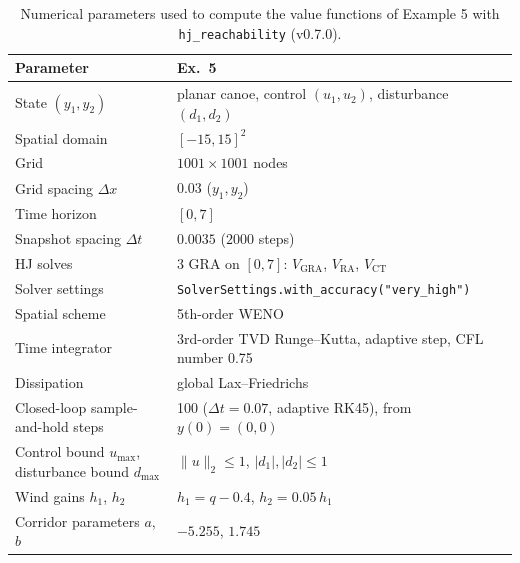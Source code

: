 \begin{table}[h]
\centering
\caption{Numerical parameters used to compute the value functions of Example 5 with \texttt{hj\_reachability} (v0.7.0).}
\label{tab:ex5_numerics}
\begin{tabular}{ll}
\toprule
Parameter & Ex.~5 \\
\midrule
State $(y_1, y_2)$ & planar canoe, control $(u_1, u_2)$, disturbance $(d_1, d_2)$ \\
Spatial domain & $[-15, 15]^2$ \\
Grid & $1001 \times 1001$ nodes \\
Grid spacing $\Delta x$ & $0.03$ ($y_1, y_2$) \\
Time horizon & $[0, 7]$ \\
Snapshot spacing $\Delta t$ & $0.0035$ ($2000$ steps) \\
HJ solves & $3$ GRA on $[0, 7]$: $V_{\mathrm{GRA}}$, $V_{\mathrm{RA}}$, $V_{\mathrm{CT}}$ \\
Solver settings & \texttt{SolverSettings.with\_accuracy("very\_high")} \\
Spatial scheme & 5th-order WENO \\
Time integrator & 3rd-order TVD Runge--Kutta, adaptive step, CFL number 0.75 \\
Dissipation & global Lax--Friedrichs \\
Closed-loop sample-and-hold steps & 100 ($\Delta t = 0.07$, adaptive RK45), from $y(0) = (0, 0)$ \\
\midrule
Control bound $u_{\max}$, disturbance bound $d_{\max}$ & $\|u\|_2 \le 1$, $|d_1|, |d_2| \le 1$ \\
Wind gains $h_1$, $h_2$ & $h_1 = q - 0.4$, $h_2 = 0.05\, h_1$ \\
Corridor parameters $a$, $b$ & $-5.255$, $1.745$ \\
\bottomrule
\end{tabular}
\end{table}
